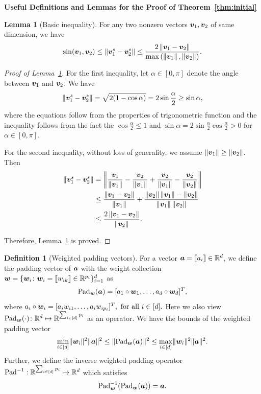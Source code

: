\documentclass[journal]{IEEEtran}
\theoremstyle{definition}
\newtheorem{lem}{Lemma}
\theoremstyle{definition}
\newtheorem{defn}{Definition}
\begin{document}
{\bf Useful Definitions and Lemmas for the Proof of Theorem~\ref{thm:initial}} 

\begin{lem}[Basic inequality]\label{lem:norm_diff} For any two nonzero vectors $\bm{v}_1,\bm{v}_2$ of same dimension, we have 
\[
\sin(\bm{v}_1 , \bm{v}_2) \leq \left\lVert{\bm{v}_1^s}-{\bm{v}_2^s}\right\rVert\leq {2\left\lVert\bm{v}_1-\bm{v}_2\right\rVert\over \max\left(\left\lVert\bm{v}_1\right\rVert,\left\lVert\bm{v}_2\right\rVert\right)}.
\]
\end{lem}
\begin{proof}[Proof of Lemma~\ref{lem:norm_diff}]
For the first inequality, let $\alpha \in [0,\pi]$ denote the angle between $\bm{v}_1$ and $\bm{v}_2$. We have 
\begin{align}
     \left\lVert{\bm{v}_1^s}-{\bm{v}_2^s}\right\rVert = \sqrt{2(1 - \cos \alpha)} = 2 \sin \frac{\alpha}{2} \geq \sin \alpha,
\end{align}
where the equations follow from the properties of trigonometric function and the inequality follows from the fact the $\cos \frac{\alpha}{2} \leq 1$ and $\sin \alpha = 2 \sin \frac{\alpha}{2} \cos \frac{\alpha}{2} > 0$ for $\alpha \in [0, \pi]$. 

For the second inequality, without loss of generality, we assume $\left\lVert\bm{v}_1\right\rVert\geq \left\lVert\bm{v}_2\right\rVert$. Then
\begin{align}
\left\lVert{\bm{v}_1^s}-{\bm{v}_2^s}\right\rVert&=\left\lVert{\bm{v}_1\over \left\lVert\bm{v}_1\right\rVert}- {\bm{v}_2\over \left\lVert\bm{v}_1\right\rVert}+{\bm{v}_2\over \left\lVert\bm{v}_1\right\rVert}-{\bm{v}_2\over \left\lVert\bm{v}_2\right\rVert}\right\rVert\\
&\leq {\left\lVert\bm{v}_1-\bm{v}_2\right\rVert\over \left\lVert\bm{v}_1\right\rVert}+{\left\lVert\bm{v}_2\right\rVert\left\lVert\bm{v}_1\right\rVert-\left\lVert\bm{v}_2\right\rVert\over \left\lVert\bm{v}_1\right\rVert\left\lVert\bm{v}_2\right\rVert}\\
&\leq {2\left\lVert\bm{v}_1-\bm{v}_2\right\rVert\over \left\lVert\bm{v}_2\right\rVert}.
\end{align}

Therefore, Lemma~\ref{lem:norm_diff} is proved.
\end{proof}

\begin{defn}[Weighted padding vectors]\label{def:pad} For a vector $\bm{a} = \llbracket a_i \rrbracket \in \mathbb{R}^d$, we define the padding vector of $\bm{a}$ with the weight collection $\bm{w} = \{\bm{w}_i\colon \bm{w}_i = \llbracket w_{ik} \rrbracket \in \mathbb{R}^{p_i}\}_{i = 1}^d$ as
\begin{equation}\label{eq:paddef}
    \pad_{\mw}(\ma) = [a_1 \circ \mw_1, \ldots, a_d \circ \mw_d]^T, 
\end{equation}
where $ a_i \circ \bm{w}_i = [a_i w_{i1},\ldots, a_i w_{i p_i}]^T, \text{ for all } i \in [d].$
Here we also view $\text{Pad}_{\bm{w}}(\cdot)\colon \mathbb{R}^{d}\mapsto \mathbb{R}^{\sum_{i\in[d]}p_i}$ as an operator. 
We have the bounds of the weighted padding vector
\begin{equation}\label{eq:pad_bound}
     \min_{i \in [d]} \onormSize{}{\mw_i}^2 \onormSize{}{\ma}^2 \leq \onormSize{}{\pad_{\mw}(\ma)}^2 \leq \max_{i \in [d]} \onormSize{}{\mw_i}^2 \onormSize{}{\ma}^2.
\end{equation}
Further, we define the inverse weighted padding operator $\text{Pad}^{-1}: \mathbb{R}^{\sum_{i\in[d]}p_i}\mapsto \mathbb{R}^d$ which satisfies 
\begin{equation}
    \text{Pad}^{-1}_{\bm{w}}(\text{Pad}_{\bm{w}}(\bm{a})) = \bm{a}.
\end{equation}
\end{defn}
\end{document}
